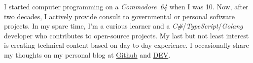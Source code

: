 \documentclass[10pt,a4paper]{article}
\begin{document}


\vspace{-1.3em}
\begin{multicols}{2}
    \noindent
    I started computer programming on a \textit{Commodore~64} when I was 10.
    Now, after two decades, I actively provide consult to governmental or
    personal software projects. In my spare time, I'm a curious learner and a
    \textit{C\#}/\textit{TypeScript}/\textit{Golang} developer who contributes
    to open-source projects. My last but not least interest is creating
    technical content based on day-to-day experience. I occasionally share my
    thoughts on my personal blog at \href{https://babakks.github.io}{Github} and
    \href{https://dev.to/babakks}{DEV}.
\end{multicols}
\sectionrule{}
\end{document}
